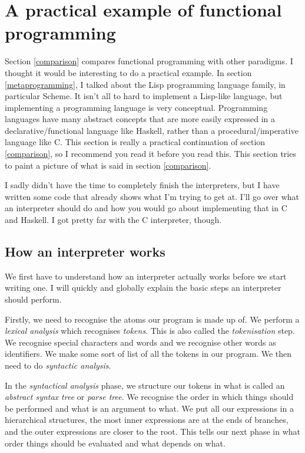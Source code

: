 \documentclass[11pt]{article}
\begin{document}
\section{A practical example of functional programming}

Section \ref{comparison} compares functional programming with other paradigms.
I thought it would be interesting to do a practical example. In section
\ref{metaprogramming}, I talked about the Lisp programming language family, in
particular Scheme. It isn't all to hard to implement a Lisp-like language, but
implementing a programming language is very conceptual. Programming languages
have many abstract concepts that are more easily expressed in a
declarative/functional language like Haskell, rather than a
procedural/imperative language like C. This section is really a practical
continuation of section \ref{comparison}, so I recommend you read it before you
read this. This section tries to paint a picture of what is said in section
\ref{comparison}.

I sadly didn't have the time to completely finish the interpreters, but I have
written some code that already shows what I'm trying to get at. I'll go over
what an interpreter should do and how you would go about implementing that in C
and Haskell. I got pretty far with the C interpreter, though.

\subsection{How an interpreter works}

We first have to understand how an interpreter actually works before we start
writing one. I will quickly and globally explain the basic steps an interpreter
should perform.

Firstly, we need to recognise the atoms our program is made up of. We perform a
\emph{lexical analysis} which recognises \emph{tokens}. This is also called the
\emph{tokenisation} step. We recognise special characters and words and we
recognise other words as identifiers. We make some sort of list of all the
tokens in our program. We then need to do \emph{syntactic analysis}.

In the \emph{syntactical analysis} phase, we structure our tokens in what is
called an \emph{abstract syntax tree} or \emph{parse tree}. We recognise the
order in which things should be performed and what is an argument to what. We
put all our expressions in a hierarchical structures, the most inner
expressions are at the ends of branches, and the outer expressions are closer
to the root. This tells our next phase in what order things should be evaluated
and what depends on what.
\end{document}
